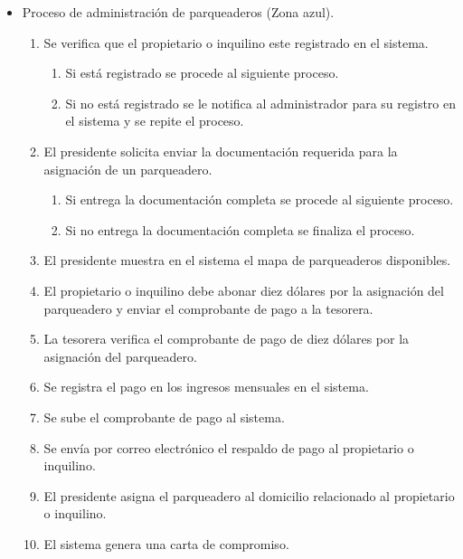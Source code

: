 \begin{itemize}
    \item Proceso de administración de parqueaderos (Zona azul).
    \begin{enumerate}
        \item Se verifica que el propietario o inquilino este registrado en el sistema.
        \begin{enumerate}
            \item Si está registrado se procede al siguiente proceso.
            \item Si no está registrado se le notifica al administrador para su registro en el sistema y se repite el proceso.
        \end{enumerate}
        \item El presidente solicita enviar la documentación requerida para la asignación de un parqueadero.
        \begin{enumerate}
            \item Si entrega la documentación completa se procede al siguiente proceso.
            \item Si no entrega la documentación completa se finaliza el proceso.
        \end{enumerate}
        \item El presidente muestra en el sistema el mapa de parqueaderos disponibles.
        \item El propietario o inquilino debe abonar diez dólares por la asignación del parqueadero y enviar el comprobante de pago a la tesorera.
        \item La tesorera verifica el comprobante de pago de diez dólares por la asignación del parqueadero.
        \item Se registra el pago en los ingresos mensuales en el sistema.
        \item Se sube el comprobante de pago al sistema.
        \item Se envía por correo electrónico el respaldo de pago al propietario o inquilino.
        \item El presidente asigna el parqueadero al domicilio relacionado al propietario o inquilino.
        \item El sistema genera una carta de compromiso.
    \end{enumerate}


\end{itemize}
